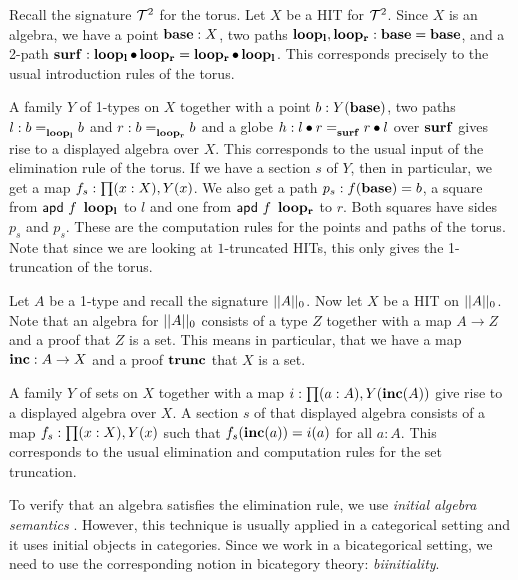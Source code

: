 \begin{example}
Recall the signature $\mathcal{T}^2$ for the torus.
Let $X$ be a HIT for $\mathcal{T}^2$.
Since $X$ is an algebra, we have a point $\operatorname{\mathbf{base}} : X$, two paths $\operatorname{\mathbf{loop_l}}, \operatorname{\mathbf{loop_r}} : \operatorname{\mathbf{base}} = \operatorname{\mathbf{base}}$,
and a 2-path $\operatorname{\mathbf{surf}} : \operatorname{\mathbf{loop_l}} \bullet \operatorname{\mathbf{loop_r}} = \operatorname{\mathbf{loop_r}} \bullet \operatorname{\mathbf{loop_l}}$.
This corresponds precisely to the usual introduction rules of the torus.

A family $Y$ of 1-types on $X$ together with a point $b : Y(\operatorname{\mathbf{base}})$,
two paths $l : b =_{\operatorname{\mathbf{loop_l}}}^{} b$ and $r : b =_{\operatorname{\mathbf{loop_r}}}^{} b$
and a globe $h : l \bullet r =_{\operatorname{\mathbf{surf}}}^{} r \bullet l$
over $\operatorname{\mathbf{surf}}$ gives rise to a displayed algebra over $X$.
This corresponds to the usual input of the elimination rule of the torus.
If we have a section $s$ of $Y$, then in particular, we get a map $f_s : \prod (x : X) , Y(x)$.
We also get a path $p_s : f(\operatorname{\mathbf{base}}) = b$, a square from $\mathsf{apd} \ f \ \operatorname{\mathbf{loop_l}}$ to $l$ and one from $\mathsf{apd} \ f \ \operatorname{\mathbf{loop_r}}$ to $r$.
Both squares have sides $p_s$ and $p_s$.
These are the computation rules for the points and paths of the torus.
Note that since we are looking at $1$-truncated HITs, this only gives the 1-truncation of the torus.
\end{example}

\begin{example}
Let $A$ be a 1-type and recall the signature $|| A ||_0$.
Now let $X$ be a HIT on $|| A ||_0$.
Note that an algebra for $|| A ||_0$ consists of a type $Z$ together with a map $A \rightarrow Z$
and a proof that $Z$ is a set.
This means in particular, that we have a map $\operatorname{\mathbf{inc}} : A \rightarrow X$ and a proof $\operatorname{\mathbf{trunc}}$
that $X$ is a set.

A family $Y$ of sets on $X$ together with a map $i : \prod (a  : A) , Y(\operatorname{\mathbf{inc}}(A))$
give rise to a displayed algebra over $X$.
A section $s$ of that displayed algebra consists of a map $f_s : \prod (x : X) , Y(x)$
such that $f_s(\operatorname{\mathbf{inc}}(a)) = i(a)$ for all $a : A$.
This corresponds to the usual elimination and computation rules for the
set truncation.
\end{example}

To verify that an algebra satisfies the elimination rule, we use \emph{initial algebra semantics} \cite{hermida1998structural}.
However, this technique is usually applied in a categorical setting and it uses initial objects in categories.
Since we work in a bicategorical setting, we need to use the corresponding notion in bicategory theory: \emph{biinitiality}.

